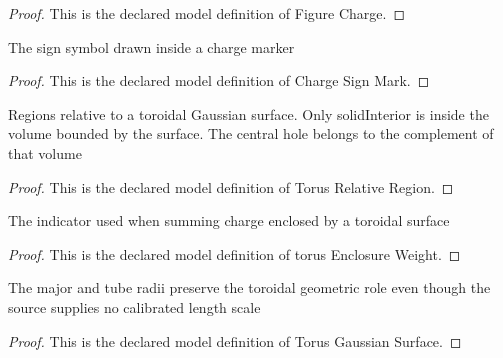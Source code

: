 \begin{proof}
  This is the declared model definition of Figure Charge.
\end{proof}
\begin{definition}
  \label{def:physics:phyx-mini-0847:phyxminiproblems-problemphyxmini0847-chargesignmark}
  The sign symbol drawn inside a charge marker
\end{definition}
\begin{proof}
  This is the declared model definition of Charge Sign Mark.
\end{proof}
\begin{definition}
  \label{def:physics:phyx-mini-0847:phyxminiproblems-problemphyxmini0847-torusrelativeregion}
  Regions relative to a toroidal Gaussian surface. Only solidInterior is inside the volume bounded by the surface. The central hole belongs to the complement of that volume
\end{definition}
\begin{proof}
  This is the declared model definition of Torus Relative Region.
\end{proof}
\begin{definition}
  \label{def:physics:phyx-mini-0847:phyxminiproblems-problemphyxmini0847-torusenclosureweight}
  The indicator used when summing charge enclosed by a toroidal surface
\end{definition}
\begin{proof}
  This is the declared model definition of torus Enclosure Weight.
\end{proof}
\begin{definition}
  \label{def:physics:phyx-mini-0847:phyxminiproblems-problemphyxmini0847-torusgaussiansurface}
  The major and tube radii preserve the toroidal geometric role even though the source supplies no calibrated length scale
\end{definition}
\begin{proof}
  This is the declared model definition of Torus Gaussian Surface.
\end{proof}
